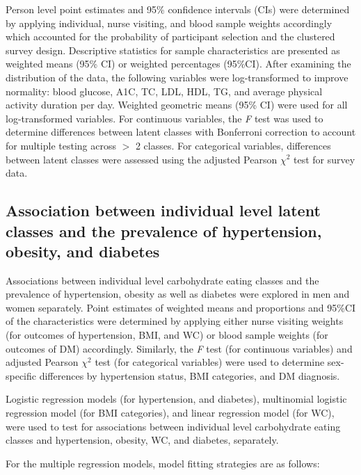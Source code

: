 Person level point estimates and 95\% confidence intervals (CIs) were determined by applying individual, nurse visiting, and blood sample weights accordingly which accounted for the probability of participant selection and the clustered survey design. Descriptive statistics for sample characteristics are presented as weighted means (95\% CI) or weighted percentages (95\%CI). After examining the distribution of the data, the following variables were log-transformed to improve normality: blood glucose, A1C, TC, LDL, HDL, TG, and average physical activity duration per day. Weighted geometric means (95\% CI) were used for all log-transformed variables. For continuous variables, the \textit{F} test was used to determine differences between latent classes with Bonferroni correction to account for multiple testing across $>$ 2 classes. For categorical variables, differences between latent classes were assessed using the adjusted Pearson $\chi^2$ test for survey data.\vspace{-0.5cm}


\subsection{Association between individual level latent classes and the prevalence of hypertension, obesity, and diabetes}\vspace{-0.3cm}


Associations between individual level carbohydrate eating classes and the prevalence of hypertension, obesity as well as diabetes were explored in men and women separately. Point estimates of weighted means and proportions and 95\%CI of the characteristics were determined by applying either nurse visiting weights (for outcomes of hypertension, BMI, and WC) or blood sample weights (for outcomes of DM) accordingly. Similarly, the \textit{F} test (for continuous variables) and adjusted Pearson $\chi^2$ test (for categorical variables) were used to determine sex-specific differences by hypertension status, BMI categories, and DM diagnosis. 

Logistic regression models (for hypertension, and diabetes), multinomial logistic regression model (for BMI categories), and linear regression model (for WC), were used to test for associations between individual level carbohydrate eating classes and hypertension, obesity, WC, and diabetes, separately.

For the multiple regression models, model fitting strategies are as follows: 

